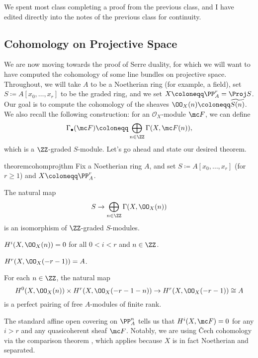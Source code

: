 \documentclass[../notes.tex]{subfiles}
\begin{document}
We spent most class completing a proof from the previous class, and I have edited directly into the notes of the previous class for continuity.

\subsection{Cohomology on Projective Space}
We are now moving towards the proof of Serre duality, for which we will want to have computed the cohomology of some line bundles on projective space. Throughout, we will take $A$ to be a Noetherian ring (for example, a field), set $S\coloneqq A[x_0,\ldots,x_r]$ to be the graded ring, and we set $X\coloneqq\PP^r_A=\Proj S$. Our goal is to compute the cohomology of the sheaves $\OO_X(n)\coloneqq\widetilde{S(n)}$. We also recall the following construction: for an $\mathcal O_X$-module $\mc F$, we can define
\[\Gamma_\bullet(\mc F)\coloneqq\bigoplus_{n\in\ZZ}\Gamma(X,\mc F(n)),\]
which is a $\ZZ$-graded $S$-module. Let's go ahead and state our desired theorem.
\begin{restatable}{theorem}{cohomprojthm} \label{thm:cohom-proj-space}
	Fix a Noetherian ring $A$, and set $S\coloneqq A[x_0,\ldots,x_r]$ (for $r\ge1$) and $X\coloneqq\PP^r_A$.
	\begin{listalph}
		\item The natural map
		\[S\to\bigoplus_{n\in\ZZ}\Gamma(X,\OO_X(n))\]
		is an isomorphism of $\ZZ$-graded $S$-modules.
		\item $H^i(X,\OO_X(n))=0$ for all $0<i<r$ and $n\in\ZZ$.
		\item $H^r(X,\OO_X(-r-1))=A$.
		\item For each $n\in\ZZ$, the natural map
		\[H^0(X,\OO_X(n))\times H^r(X,\OO_X(-r-1-n))\to H^r(X,\OO_X(-r-1))\cong A\]
		is a perfect pairing of free $A$-modules of finite rank.
	\end{listalph}
\end{restatable}
\begin{remark} \label{rem:cech-proj-space}
	The standard affine open covering on $\PP^n_A$ tells us that $H^i(X,\mc F)=0$ for any $i>r$ and any quasicoherent sheaf $\mc F$. Notably, we are using \v Cech cohomology via the comparison theorem , which applies because $X$ is in fact Noetherian and separated.
\end{remark}
\end{document}
